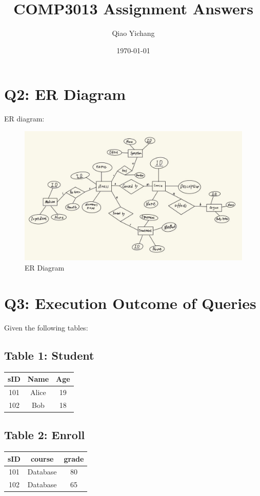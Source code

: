 \documentclass{article}
\begin{document}
	
	\title{COMP3013 Assignment Answers}
	\author{Qiao Yichang}
	\date{\today}
	\maketitle
	
	
	\section*{Q2: ER Diagram}
	ER diagram:
	\begin{figure}[h]
		\centering
		\includegraphics[scale=0.25]{./diagram.jpg}
		\caption{ER Diagram}
	\end{figure}
	
	\section*{Q3: Execution Outcome of Queries}
Given the following tables:

\subsection*{Table 1: Student}
\begin{tabular}{|c|c|c|}
	\hline
	sID & Name  & Age \\
	\hline
	101 & Alice & 19  \\
	102 & Bob   & 18  \\
	\hline
\end{tabular}

\subsection*{Table 2: Enroll}
\begin{tabular}{|c|c|c|}
	\hline
	sID & course   & grade \\
	\hline
	101 & Database & 80    \\
	102 & Database & 65    \\
	\hline
\end{tabular}
\end{document}
